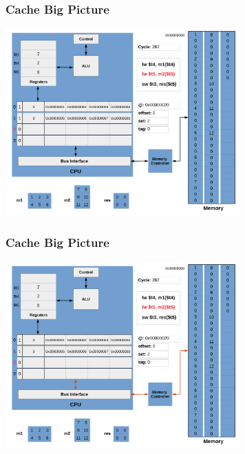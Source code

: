 \documentclass{beamer}
\begin{document}
\begin{frame}[fragile]
\frametitle{Cache Big Picture}

\begin{center}
\vspace*{-0.23cm}
\hspace*{-1cm}\includegraphics[width=9cm]{cache21.pdf}
\end{center}

\end{frame}

\begin{frame}[fragile]
\frametitle{Cache Big Picture}

\begin{center}
\vspace*{-0.23cm}
\hspace*{-1cm}\includegraphics[width=9cm]{cache22.pdf}
\end{center}

\end{frame}
\end{document}
